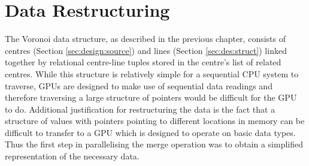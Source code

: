 \section{Data Restructuring}
The Voronoi data structure, as described in the previous chapter, consists of centres (Section \ref{sec:design:source}) and lines (Section \ref{sec:des:struct}) linked together by relational centre-line tuples stored in the centre's  list of related centres. While this structure is relatively simple for a sequential CPU system to traverse, GPUs are designed to make use of sequential data readings and therefore traversing a large structure of pointers would be difficult for the GPU to do. Additional justification for restructuring the data is the fact that a structure of values with pointers pointing to different locations in memory can be difficult to transfer to a GPU which is designed to operate on basic data types. Thus the first step in parallelising the merge operation was to obtain a simplified representation of the necessary data.
